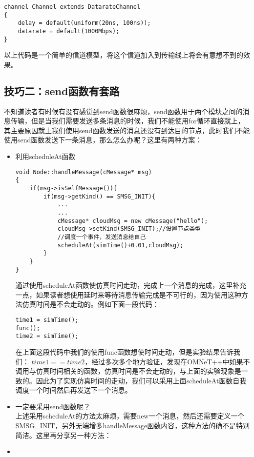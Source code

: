 \begin{lstlisting}
channel Channel extends DatarateChannel
{
	delay = default(uniform(20ns, 100ns));
	datarate = default(1000Mbps);
}
\end{lstlisting}

以上代码是一个简单的信道模型，将这个信道加入到传输线上将会有意想不到的效果。\\

\subsection{技巧二：send函数有套路}
不知道读者有时候有没有感觉到send函数很麻烦，send函数用于两个模块之间的消息传输，但是当我们需要发送多条消息的时候，我们不能使用for循环直接就上，其主要原因就上我们使用send函数发送的消息还没有到达目的节点，此时我们不能使用send函数发送下一条消息，那么怎么办呢？这里有两种方案：

\begin{itemize}
	\item 利用scheduleAt函数 
	
\begin{lstlisting}
void Node::handleMessage(cMessage* msg)
{
	if(msg->isSelfMessage()){
		if(msg->getKind() == SMSG_INIT){
			...
			...
			cMessage* cloudMsg = new cMessage("hello");
			cloudMsg->setKind(SMSG_INIT);//设置节点类型
			//调度一个事件，发送消息给自己
			scheduleAt(simTime()+0.01,cloudMsg);
		}
	}
}
\end{lstlisting}
	
通过使用scheduleAt函数使仿真时间走动，完成上一个消息的完成，这里补充一点，如果读者想使用延时来等待消息传输完成是不可行的，因为使用这种方法仿真时间是不会走动的。例如下面一段代码：

\begin{lstlisting}
time1 = simTime();
func();
time2 = simTime();
\end{lstlisting}
在上面这段代码中我们的使用func函数想使时间走动，但是实验结果告诉我们：
$time1==time2$，经过多次多个地方验证，发现在OMNeT++中如果不调用与仿真时间相关的函数，仿真时间是不会走动的，与上面的实验现象是一致的。因此为了实现仿真时间的走动，我们可以采用上面scheduleAt函数自我调度一个时间然后再发送下一个消息。
	\item 一定要采用send函数呢？\\
上述采用scheduleAt的方法太麻烦，需要new一个消息，然后还需要定义一个SMSG\_INIT，另外无端增多handleMessage函数内容，这种方法的确不是特别简洁。这里再分享另一种方法：	
	
	
	
	\item 
	
\end{itemize}




